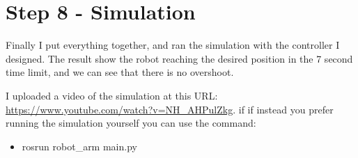 \documentclass[12pt,a4paper]{article}
\begin{document}
\section{Step 8 - Simulation}
Finally I put everything together, and ran the simulation with the controller I designed.
The result show the robot reaching the desired position in the 7 second time limit,
and we can see that there is no overshoot.

I uploaded a video of the simulation at this URL: \url{https://www.youtube.com/watch?v=NH_AHPulZkg}. if
if instead you prefer running the simulation yourself you can use the command:
\begin{itemize}
    \item rosrun robot\_arm main.py
\end{itemize}
\end{document}
